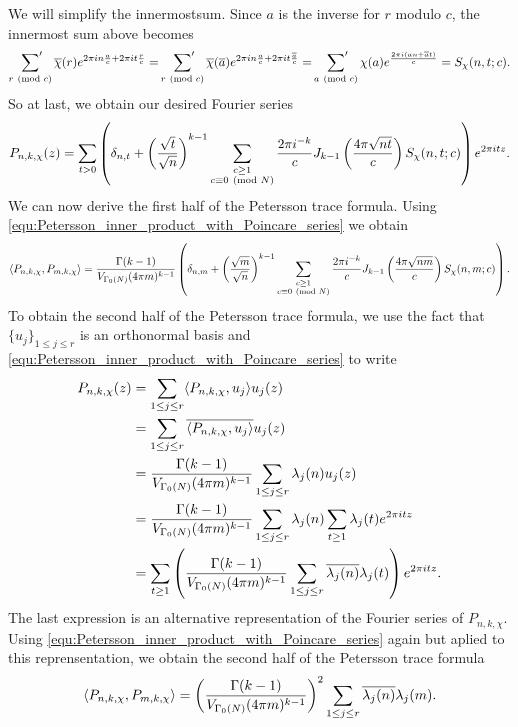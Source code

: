       We will simplify the innermostsum. Since $a$ is the inverse for $r$ modulo $c$, the innermost sum above becomes
      \[
        \sideset{}{'}\sum_{r \ \left(\text{mod }c\right)}\overline{\chi}(r)e^{2\pi in\frac{a}{c}+2\pi it\frac{r}{c}} = \sideset{}{'}\sum_{r \ \left(\text{mod }c\right)}\overline{\chi}(\overline{a})e^{2\pi in\frac{a}{c}+2\pi it\frac{\overline{a}}{c}} = \sideset{}{'}\sum_{a \ \left(\text{mod }c\right)}\chi(a)e^{\frac{2\pi i(an+\overline{a}t)}{c}} = S_{\chi}(n,t;c).
      \]
      So at last, we obtain our desired Fourier series
      \[
        P_{n,k,\chi}(z) = \sum_{t > 0}\left(\delta_{n,t}+\left(\frac{\sqrt{t}}{\sqrt{n}}\right)^{k-1}\sum_{\substack{c \ge 1 \\ c \equiv 0 \ \left(\text{mod }N\right)}}\frac{2\pi i^{-k}}{c}J_{k-1}\left(\frac{4\pi\sqrt{nt}}{c}\right)S_{\chi}(n,t;c)\right)e^{2\pi itz}.
      \]
      We can now derive the first half of the Petersson trace formula. Using \cref{equ:Petersson_inner_product_with_Poincare_series} we obtain
      \[
        \langle P_{n,k,\chi},P_{m,k,\chi}\rangle = \frac{\Gamma(k-1)}{V_{\Gamma_{0}(N)}(4\pi m)^{k-1}}\left(\delta_{n,m}+\left(\frac{\sqrt{m}}{\sqrt{n}}\right)^{k-1}\sum_{\substack{c \ge 1 \\ c \equiv 0 \ \left(\text{mod }N\right)}}\frac{2\pi i^{-k}}{c}J_{k-1}\left(\frac{4\pi\sqrt{nm}}{c}\right)S_{\chi}(n,m;c)\right).
      \]
      To obtain the second half of the Petersson trace formula, we use the fact that $\{u_{j}\}_{1 \le j \le r}$ is an orthonormal basis and \cref{equ:Petersson_inner_product_with_Poincare_series} to write
      \begin{align*}
        P_{n,k,\chi}(z) &= \sum_{1 \le j \le r}\langle P_{n,k,\chi},u_{j}\rangle u_{j}(z) \\
        &= \sum_{1 \le j \le r}\overline{\langle P_{n,k,\chi},u_{j}\rangle}u_{j}(z) \\
        &= \frac{\Gamma(k-1)}{V_{\Gamma_{0}(N)}(4\pi m)^{k-1}}\sum_{1 \le j \le r}\lambda_{j}(n)u_{j}(z) \\
        &= \frac{\Gamma(k-1)}{V_{\Gamma_{0}(N)}(4\pi m)^{k-1}}\sum_{1 \le j \le r}\lambda_{j}(n)\sum_{t \ge 1}\lambda_{j}(t)e^{2\pi itz} \\
        &= \sum_{t \ge 1}\left(\frac{\Gamma(k-1)}{V_{\Gamma_{0}(N)}(4\pi m)^{k-1}}\sum_{1 \le j \le r}\overline{\lambda_{j}(n)}\lambda_{j}(t)\right)e^{2\pi itz}.
      \end{align*}
      The last expression is an alternative representation of the Fourier series of $P_{n,k,\chi}$. Using \cref{equ:Petersson_inner_product_with_Poincare_series} again but aplied to this reprensentation, we obtain the second half of the Petersson trace formula
      \[
        \langle P_{n,k,\chi},P_{m,k,\chi}\rangle = \left(\frac{\Gamma(k-1)}{V_{\Gamma_{0}(N)}(4\pi m)^{k-1}}\right)^{2}\sum_{1 \le j \le r}\overline{\lambda_{j}(n)}\lambda_{j}(m).
      \]
